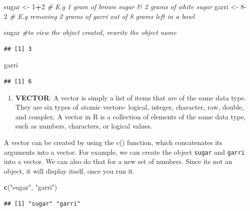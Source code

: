 \documentclass[
]{article}
\newenvironment{Shaded}{\begin{snugshade}}{\end{snugshade}}
\newcommand{\CommentTok}[1]{\textcolor[rgb]{0.56,0.35,0.01}{\textit{#1}}}
\newcommand{\DecValTok}[1]{\textcolor[rgb]{0.00,0.00,0.81}{#1}}
\newcommand{\FunctionTok}[1]{\textcolor[rgb]{0.13,0.29,0.53}{\textbf{#1}}}
\newcommand{\NormalTok}[1]{#1}
\newcommand{\OtherTok}[1]{\textcolor[rgb]{0.56,0.35,0.01}{#1}}
\newcommand{\SpecialCharTok}[1]{\textcolor[rgb]{0.81,0.36,0.00}{\textbf{#1}}}
\newcommand{\StringTok}[1]{\textcolor[rgb]{0.31,0.60,0.02}{#1}}
\providecommand{\tightlist}{%
  \setlength{\itemsep}{0pt}\setlength{\parskip}{0pt}}
\begin{document}
\begin{Shaded}
\begin{Highlighting}[]
\NormalTok{sugar }\OtherTok{\textless{}{-}} \DecValTok{1}\SpecialCharTok{+}\DecValTok{2} \CommentTok{\# E.g 1 gram of brown sugar \& 2 grams of white sugar}
\NormalTok{garri }\OtherTok{\textless{}{-}} \DecValTok{8{-}2}  \CommentTok{\# E.g removing 2 grams of garri out of 8 grams left in a bowl}


\NormalTok{sugar }\CommentTok{\#to view  the object created, rewrite the object name}
\end{Highlighting}
\end{Shaded}

\begin{verbatim}
## [1] 3
\end{verbatim}

\begin{Shaded}
\begin{Highlighting}[]
\NormalTok{garri}
\end{Highlighting}
\end{Shaded}

\begin{verbatim}
## [1] 6
\end{verbatim}

\begin{enumerate}
\def\labelenumi{\arabic{enumi}.}
\setcounter{enumi}{2}
\tightlist
\item
  \textbf{VECTOR}: A vector is simply a list of items that are of the
  same data type. They are six types of atomic vectors- logical,
  integer, character, raw, double, and complex. A vector in R is a
  collection of elements of the same data type, such as numbers,
  characters, or logical values.
\end{enumerate}

A vector can be created by using the c() function, which concatenates
its arguments into a vector. For example, we can create the object
\texttt{sugar} and \texttt{garri} into a vector. We can also do that for
a new set of numbers. Since its not an object, it will display itself,
once you run it.

\begin{Shaded}
\begin{Highlighting}[]
\FunctionTok{c}\NormalTok{(}\StringTok{"sugar"}\NormalTok{, }\StringTok{"garri"}\NormalTok{)}
\end{Highlighting}
\end{Shaded}

\begin{verbatim}
## [1] "sugar" "garri"
\end{verbatim}
\end{document}
